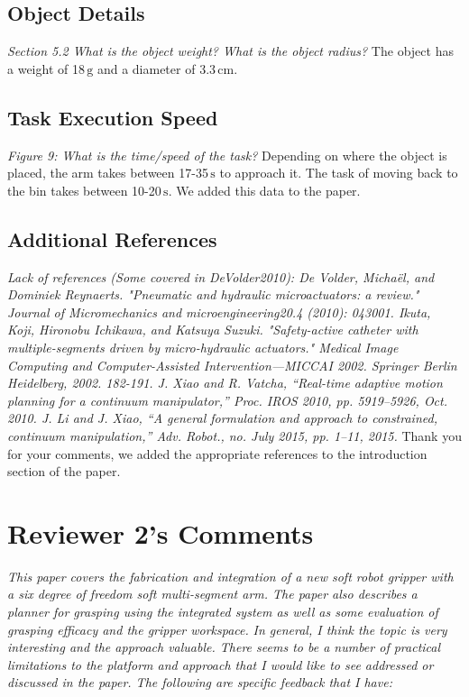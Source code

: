 \documentclass[letterpaper, 10 pt, twocolumn, conference]{article}
\newcommand{\unit}[1]{\ensuremath{\, \mathrm{#1}}} %
\begin{document}
\subsection{Object Details}
\textit{Section 5.2 What is the object weight? What is the object radius?}
%
The object has a weight of 18\unit{g} and a diameter of 3.3\unit{cm}.
%
\subsection{Task Execution Speed}
\textit{Figure 9: What is the time/speed of the task?}
%
Depending on where the object is placed, the arm takes between 17-35\unit{s} to approach it. The task of moving back to the bin takes between 10-20\unit{s}. We added this data to the paper. 
%
\subsection{Additional References}
%
\textit{Lack of references (Some covered in DeVolder2010):
De Volder, Michaël, and Dominiek Reynaerts. "Pneumatic and hydraulic microactuators: a review." Journal of Micromechanics and microengineering20.4 (2010): 043001.
Ikuta, Koji, Hironobu Ichikawa, and Katsuya Suzuki. "Safety-active catheter with multiple-segments driven by micro-hydraulic actuators." Medical Image Computing and Computer-Assisted Intervention—MICCAI 2002. Springer Berlin Heidelberg, 2002. 182-191.
J. Xiao and R. Vatcha, “Real-time adaptive motion planning for a continuum manipulator,” Proc. IROS 2010, pp. 5919–5926, Oct. 2010.
J. Li and J. Xiao, “A general formulation and approach to constrained, continuum manipulation,” Adv. Robot., no. July 2015, pp. 1–11, 2015.}
%
Thank you for your comments, we added the appropriate references to the introduction section of the paper.
%
%
\section{Reviewer 2's Comments}
%
\textit{This paper covers the fabrication and integration of a new soft robot gripper with a six degree of freedom soft multi-segment arm. The paper also describes a planner for grasping using the integrated system as well as some evaluation of grasping efficacy and the gripper workspace.}
%
\textit{In general, I think the topic is very interesting and the approach valuable. There seems to be a number of practical limitations to the platform and approach that I would like to see addressed or discussed in the paper. The following are specific feedback that I have:}
%
\end{document}

